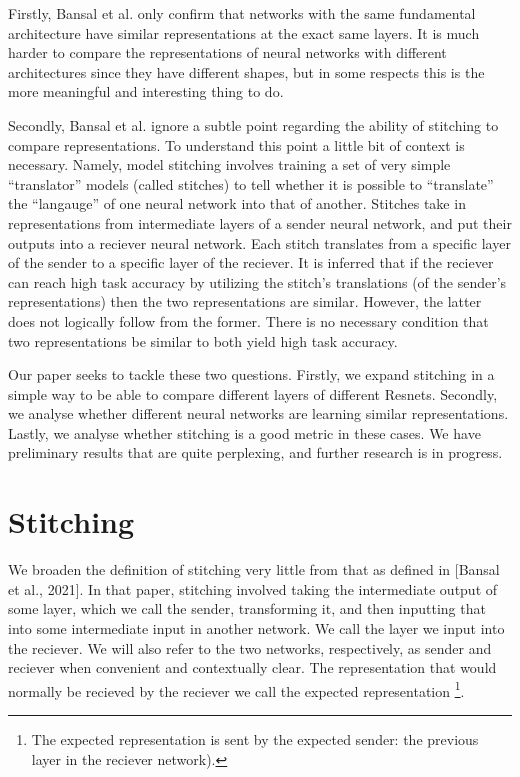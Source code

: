\documentclass{article} %
\begin{document}
Firstly, Bansal et al. only confirm that networks with the same fundamental architecture have similar representations at
the exact same layers. It is much harder to compare the representations of neural networks with different architectures
since they have different shapes, but in some respects this is the more meaningful and interesting thing to do.

Secondly, Bansal et al. ignore a subtle point regarding the ability of stitching to compare representations. To understand
this point a little bit of context is necessary. Namely,
model stitching involves training a set of very simple ``translator'' models (called stitches) 
to tell whether it is possible to
``translate'' the ``langauge'' of one neural network into that of another. Stitches take in representations
from intermediate layers of a sender neural network, and put their outputs into a reciever neural network. Each
stitch translates from a specific layer of the sender to a specific layer of the reciever. It is inferred that
if the reciever can reach high task accuracy by utilizing the stitch's translations (of the sender's representations)
then the two representations are similar. However, the latter does not logically follow
from the former. There is no necessary condition that two representations be similar to both yield 
high task accuracy.

Our paper seeks to tackle these two questions. Firstly, we expand stitching in a simple way to be able to compare
different layers of different Resnets.  Secondly, we analyse whether different neural networks are learning similar
representations. Lastly, we analyse whether stitching is a good metric in these cases. We have preliminary
results that are quite perplexing, and further research is in progress.

\section*{Stitching}
We broaden the definition of stitching very little from that as defined in [Bansal et al., 2021]. In that paper,
stitching involved taking the intermediate output of some layer, which we call the sender, transforming it, and then
inputting that into some intermediate input in another network. We call the layer we input into the reciever. We
will also refer to the two networks, respectively, as sender and reciever when convenient and contextually clear.
The representation that would normally be recieved by the reciever we call the expected representation
\footnote{The expected representation is sent by
the expected sender: the previous layer in the reciever network).}.
\end{document}
